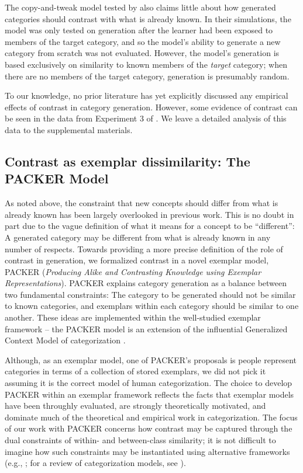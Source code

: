\documentclass[12pt]{article}
\begin{document}
\begin{flushleft}
The copy-and-tweak model tested by \cite{jern2013probabilistic} also claims
little about how generated categories should contrast with what is already
known. In their simulations, the model was only tested on generation after the
learner had been exposed to members of the target category, and so the model's
ability to generate a new category from scratch was not evaluated. However, the
model's generation is based exclusively on similarity to known members of the
{\em target} category; when there are no members of the target category,
generation is presumably random.

To our knowledge, no prior literature has yet explicitly discussed any empirical
effects of contrast in category generation. However, some evidence of contrast
can be seen in the data from Experiment 3 of \cite{jern2013probabilistic}. We
leave a detailed analysis of this data to the supplemental materials.

\subsection{Contrast as exemplar dissimilarity: The PACKER Model}

\label{section:PACKER-definition}

As noted above, the constraint that new concepts should differ from what is
already known has been largely overlooked in previous work. This is no doubt in
part due to the vague definition of what it means for a concept to be
``different'': A generated category may be different from what is already known
in any number of respects. Towards providing a more precise definition of the
role of contrast in generation, we formalized contrast in a novel exemplar
model, PACKER ({\em Producing Alike and Contrasting Knowledge using Exemplar
  Representations}). PACKER explains category generation as a balance between
two fundamental constraints: The category to be generated should not be similar
to known categories, and exemplars within each category should be similar to one
another. These ideas are implemented within the well-studied exemplar framework
-- the PACKER model is an extension of the influential Generalized Context Model
of categorization \citep[GCM;][]{nosofsky1984choice,nosofsky1986attention}.

Although, as an exemplar model, one of PACKER's proposals is people represent
categories in terms of a collection of stored exemplars, we did not pick it
assuming it is the correct model of human categorization. The choice to develop
PACKER within an exemplar framework reflects the facts that exemplar models have
been throughly evaluated, are strongly theoretically motivated, and dominate
much of the theoretical and empirical work in categorization. The focus of our
work with PACKER concerns how contrast may be captured through the dual constraints of within- and between-class
similarity; it is not difficult to imagine how such constraints may be
instantiated using alternative frameworks (e.g.,
\citealp{kurtz2007divergent,love2004sustain,smith2000thirty}; for a review of
categorization models, see \citealp{pothoswills2011}).


\end{flushleft}
\end{document}
